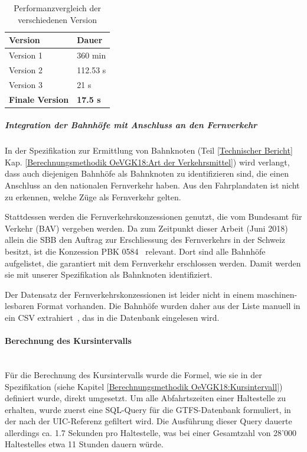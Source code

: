 \begin{table}[ht]
    \centering
    \begin{tabular}[ht]{l l}
        \toprule
        \textbf{Version} 
                                & \textbf{Dauer}\\
        \midrule
        Version 1
                                & 360 min\\
        Version 2
                                & 112.53 s\\
        Version 3
                                & 21 s\\
        \textbf{Finale Version}
                                & \textbf{17.5 s}\\            
        \bottomrule
    \end{tabular}
    \caption{Performanzvergleich der verschiedenen Version}
    \label{table:Performanzvergleich der verschiedenen Version}
\end{table}

\subparagraph{Integration der Bahnhöfe mit Anschluss an den Fernverkehr}
In der Spezifikation zur Ermittlung von Bahnknoten (Teil \ref{Technischer Bericht} Kap. \ref{Berechnungsmethodik OeVGK18:Art der Verkehrsmittel}) wird verlangt, dass auch diejenigen Bahnhöfe als Bahnknoten zu identifizieren sind, die einen Anschluss an den nationalen Fernverkehr haben.
Aus den Fahrplandaten ist nicht zu erkennen, welche Züge als Fernverkehr gelten.

Stattdessen werden die Fernverkehrskonzessionen genutzt, die vom Bundesamt für Verkehr (BAV) vergeben werden.
Da zum Zeitpunkt dieser Arbeit (Juni 2018) allein die SBB den Auftrag zur Erschliessung des Fernverkehrs in der Schweiz besitzt, ist die Konzession PBK 0584~\cite{bav_tu_verzeichnis} relevant.
Dort sind alle Bahnhöfe aufgelistet, die garantiert mit dem Fernverkehr erschlossen werden.
Damit werden sie mit unserer Spezifikation als Bahnknoten identifiziert.

Der Datensatz der Fernverkehrskonzessionen ist leider nicht in einem maschinen-lesbaren Format vorhanden.
Die Bahnhöfe wurden daher aus der Liste manuell in ein CSV extrahiert~\cite{github:oevgk18-generator}, das in die Datenbank eingelesen wird.

\paragraph{Berechnung des Kursintervalls}~\\
Für die Berechnung des Kursintervalls wurde die Formel, wie sie in der Spezifikation (siehe Kapitel \ref{Berechnungsmethodik OeVGK18:Kursintervall}) definiert wurde, direkt umgesetzt.
Um alle Abfahrtszeiten einer \gls{Haltestelle} zu erhalten, wurde zuerst eine SQL-Query für die GTFS-Datenbank formuliert, in der nach der \acs{UIC}-Referenz gefiltert wird.
Die Ausführung dieser Query dauerte allerdings ca. 1.7 Sekunden pro \gls{Haltestelle}, was bei einer Gesamtzahl von 28'000 \glspl{Haltestelle} etwa 11 Stunden dauern würde.

